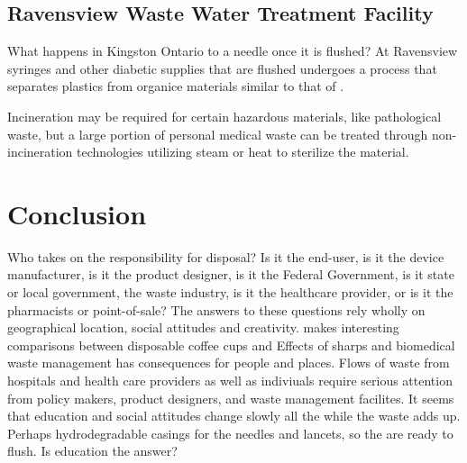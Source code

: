 \documentclass[12pt]{article}
\begin{document}
\subsection{Ravensview Waste Water Treatment Facility}
What happens in Kingston Ontario to a needle once it is flushed?
At Ravensview syringes and other diabetic supplies that are flushed undergoes a process that separates plastics from organice materials similar to that of \citet{anthony_method_1994}. 


% 
% 

Incineration may be required for certain hazardous materials, like pathological waste, but a large portion of personal medical waste can be treated through non-incineration technologies utilizing steam or heat to sterilize the material. 


\section{Conclusion}
Who takes on the responsibility for disposal?  Is it the end-user, is it the device manufacturer, is it the product designer, is it the Federal Government, is it state or local government, the waste industry, is it the healthcare provider, or is it the pharmacists or point-of-sale? The answers to these questions rely wholly on geographical location, social attitudes and creativity. \citet{krisiunas_waste_2011} makes interesting comparisons between disposable coffee cups and 
Effects of sharps and biomedical waste management has consequences for people and places. Flows of waste from hospitals and health care providers as well as indiviuals require serious attention from policy makers, product designers, and waste management facilites. 
It seems that education and social attitudes change slowly all the while the waste adds up. Perhaps hydrodegradable casings for the needles and lancets, so the are ready to flush. Is education the answer?
\end{document}
